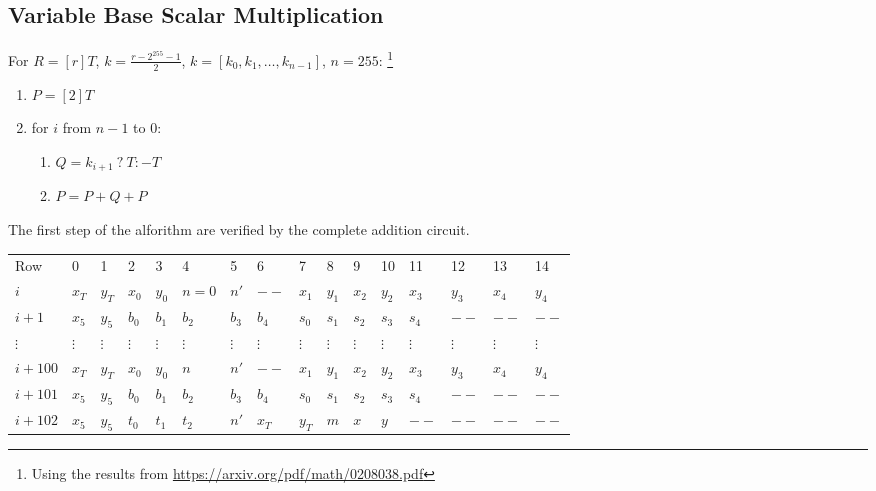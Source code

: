 \subsection{Variable Base Scalar Multiplication}
For $R  = [r]T$, $k = \frac{r - 2^{255} - 1}{2}$, $k = [k_0, k_1, \dots, k_{n - 1}]$, $n = 255$:
\footnote{Using the results from \url{https://arxiv.org/pdf/math/0208038.pdf}}
\begin{enumerate}
    \item $P = [2]T$
    \item for $i$ from $n - 1$ to $0$:
    \begin{enumerate}
        \item $Q = k_{i + 1} \: ? \: T : -T$
        \item $P = P + Q + P$
    \end{enumerate}
\end{enumerate}

The first step of the alforithm are verified by the complete addition circuit. 

\begin{center}
    \begin{table}[H]
        \begin{tabular}{llllllllllllllll}
            Row     & 0        & 1        & 2        & 3        & 4        & 5        & 6        & 7        & 8        & 9        & 10       & 11       & 12       & 13       & 14       \\
            $i$    & $x_T$    & $y_T$    & $x_0$    & $y_0$    & $n = 0$    & $n'$    & $--$    & $x_1$    & $y_1$    & $x_2$    & $y_2$    & $x_3$    & $y_3$ & $x_4$ & $y_4$ \\
            $i + 1$   & $x_5$    & $y_5$    & $b_0$    & $b_1$    & $b_2$    & $b_3$    & $b_4$      & $s_0$    & $s_1$    & $s_2$    & $s_3$    & $s_4$    & $--$ & $--$ & $--$ \\
            $\vdots$  & $\vdots$ & $\vdots$ & $\vdots$ & $\vdots$ & $\vdots$ & $\vdots$ & $\vdots$ & $\vdots$ & $\vdots$ & $\vdots$ & $\vdots$ & $\vdots$ & $\vdots$ & $\vdots$ & $\vdots$ \\
            $i + 100$ & $x_T$    & $y_T$    & $x_0$    & $y_0$    & $n$    & $n'$    & $--$    & $x_1$    & $y_1$    & $x_2$    & $y_2$    & $x_3$    & $y_3$ & $x_4$ & $y_4$ \\
            $i + 101$ & $x_5$    & $y_5$    & $b_0$    & $b_1$    & $b_2$    & $b_3$    & $b_4$      & $s_0$    & $s_1$    & $s_2$    & $s_3$    & $s_4$    & $--$ & $--$ & $--$ \\
            $i + 102$ & $x_5$    & $y_5$    & $t_0$    & $t_1$    & $t_2$    & $n'$    & $x_T$      & $y_T$    & $m$    & $x$    & $y$    & $--$    & $--$ & $--$ & $--$ \\
        \end{tabular}
    \end{table}
\end{center}

